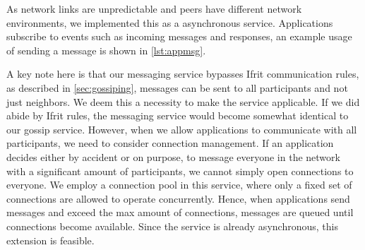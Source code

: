 \documentclass[USenglish]{uit-thesis}
\begin{document}
As network links are unpredictable and peers have different network environments, we implemented this as a asynchronous service.
Applications subscribe to events such as incoming messages and responses, an example usage of sending a message is shown in \autoref{lst:appmsg}.  



\begin{code}
\end{code}


A key note here is that our messaging service bypasses Ifrit communication rules, as described in \autoref{sec:gossiping}, messages can be sent to all participants and not just neighbors.
We deem this a necessity to make the service applicable.
If we did abide by Ifrit rules, the messaging service would become somewhat identical to our gossip service.
However, when we allow applications to communicate with all participants, we need to consider connection management.
If an application decides either by accident or on purpose, to message everyone in the network with a significant amount of participants, we cannot simply open connections to everyone.
We employ a connection pool in this service, where only a fixed set of connections are allowed to operate concurrently.
Hence, when applications send messages and exceed the max amount of connections, messages are queued until connections become available.
Since the service is already asynchronous, this extension is feasible.

\end{document}

